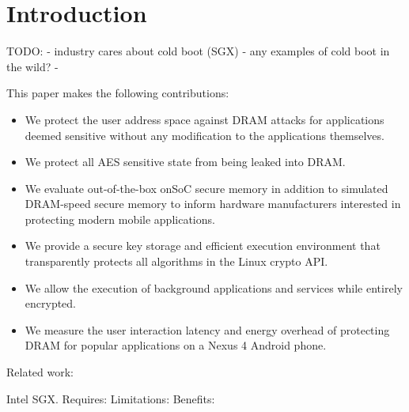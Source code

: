 \chapter{Introduction}
\label{introduction}

TODO:
- industry cares about cold boot (SGX)
  - any examples of cold boot in the wild?
- 

This paper makes the following contributions:
\begin{itemize}
    \item We protect the user address space against DRAM attacks for applications deemed 
        sensitive without any modification to the applications themselves.
    \item We protect all AES sensitive state from being leaked into DRAM.
    \item We evaluate out-of-the-box onSoC secure memory in addition to simulated DRAM-speed 
        secure memory to inform hardware manufacturers interested in protecting modern 
        mobile applications.
    \item We provide a secure key storage and efficient execution environment that 
        transparently protects all algorithms in the Linux crypto API.
    \item We allow the execution of background applications and services while entirely encrypted.
    \item We measure the user interaction latency and energy overhead of protecting DRAM for 
        popular applications on a Nexus 4 Android phone.
\end{itemize}


Related work:

Intel SGX.
Requires:
Limitations:
Benefits:


